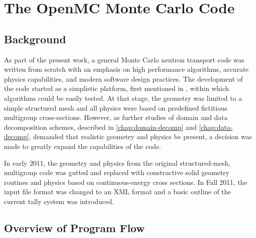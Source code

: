 \chapter{The OpenMC Monte Carlo Code}
\label{chap:openmc}

\section{Background}

As part of the present work, a general Monte Carlo neutron transport code was
written from scratch with an emphasis on high performance algorithms, accurate
physics capabilities, and modern software design practices. The development of
the code started as a simplistic platform, first mentioned in
\cite{lanl-romano-2009}, within which algorithms could be easily tested. At that
stage, the geometry was limited to a simple structured mesh and all physics were
based on predefined fictitious multigroup cross-sections. However, as further
studies of domain and data decomposition schemes, described in
\autoref{chap:domain-decomp} and \autoref{chap:data-decomp}, demanded that
realistic geometry and physics be present, a decision was made to greatly expand
the capabilities of the code.

In early 2011, the geometry and physics from the original structured-mesh,
multigroup code was gutted and replaced with constructive solid geometry
routines and physics based on continuous-energy cross sections. In Fall 2011,
the input file format was changed to an XML format and a basic outline of the
current tally system was introduced.

\section{Overview of Program Flow}

